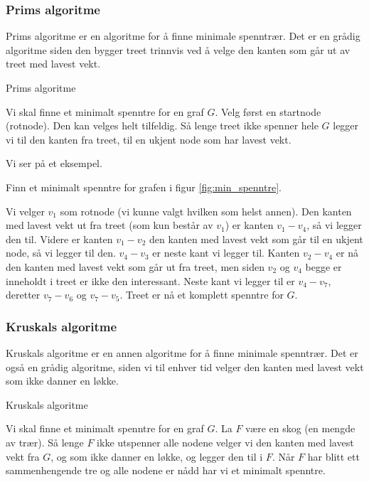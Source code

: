 \subsubsection{Prims algoritme}
\label{prim}

Prims algoritme er en algoritme for å finne minimale spenntrær. Det er en grådig algoritme siden den bygger treet trinnvis ved å velge den kanten som går ut av treet med lavest vekt. 

\begin{teorem} Prims algoritme

Vi skal finne et minimalt spenntre for en graf $ G $. Velg først en startnode (rotnode). Den kan velges helt tilfeldig. Så lenge treet ikke spenner hele $ G $ legger vi til den kanten fra treet, til en ukjent node som har lavest vekt.
\end{teorem}

\noindent Vi ser på et eksempel.

\begin{eks} Finn et minimalt spenntre for grafen i figur \ref{fig:min_spenntre}.

Vi velger $ v_1 $ som rotnode (vi kunne valgt hvilken som helst annen). Den kanten med lavest vekt ut fra treet (som kun består av $ v_1 $) er kanten $ v_1-v_4 $, så vi legger den til. Videre er kanten $ v_1-v_2 $ den kanten med lavest vekt som går til en ukjent node, så vi legger til den. $ v_4-v_3 $ er neste kant vi legger til. Kanten $ v_2-v_4 $ er nå den kanten med lavest vekt som går ut fra treet, men siden $ v_2 $ og $ v_4 $ begge er inneholdt i treet er ikke den interessant. Neste kant vi legger til er $ v_4-v_7 $, deretter $ v_7-v_6 $ og $ v_7-v_5 $. Treet er nå et komplett spenntre for $ G $. 
\end{eks}


\subsubsection{Kruskals algoritme}
\label{kruskal}

Kruskals algoritme er en annen algoritme for å finne minimale spenntrær. Det er også en grådig algoritme, siden vi til enhver tid velger den kanten med lavest vekt som ikke danner en løkke.

\begin{teorem} Kruskals algoritme

Vi skal finne et minimalt spenntre for en graf $ G $. La $ F $ være en skog (en mengde av trær). Så lenge $ F $ ikke utspenner alle nodene velger vi den kanten med lavest vekt fra $ G $, og som ikke danner en løkke, og legger den til i $ F $. Når $ F $ har blitt ett sammenhengende tre og alle nodene er nådd har vi et minimalt spenntre.
\end{teorem}

